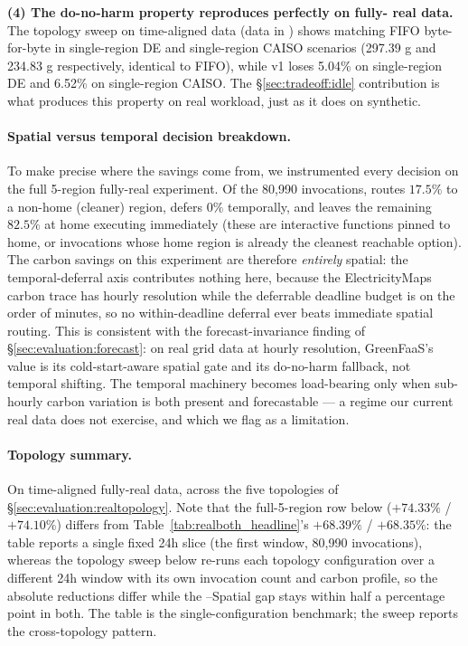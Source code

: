 \textbf{(4) The do-no-harm property reproduces perfectly on fully-
real data.} The topology sweep on time-aligned data (data in
) shows
\GreenFaaS{} matching FIFO byte-for-byte in single-region DE and
single-region CAISO scenarios (297.39 g and 234.83 g respectively,
identical to FIFO), while v1 loses 5.04\% on single-region DE and
6.52\% on single-region CAISO. The
\S\ref{sec:tradeoff:idle} contribution is what produces this
property on real workload, just as it does on synthetic.

\paragraph{Spatial versus temporal decision breakdown.}
To make precise where the savings come from, we instrumented every
\GreenFaaS{} decision on the full 5-region fully-real experiment. Of
the 80{,}990 invocations, \GreenFaaS{} routes $17.5\%$ to a non-home
(cleaner) region, defers $0\%$ temporally, and leaves the
remaining $82.5\%$ at home executing immediately (these are
interactive functions pinned to home, or invocations whose home
region is already the cleanest reachable option). The carbon savings
on this experiment are therefore \emph{entirely} spatial: the
temporal-deferral axis contributes nothing here, because the
ElectricityMaps carbon trace has hourly resolution while the
deferrable deadline budget is on the order of minutes, so no
within-deadline deferral ever beats immediate spatial routing. This
is consistent with the forecast-invariance finding of
\S\ref{sec:evaluation:forecast}: on real grid data at hourly
resolution, GreenFaaS's value is its cold-start-aware spatial gate
and its do-no-harm fallback, not temporal shifting. The temporal
machinery becomes load-bearing only when sub-hourly carbon variation
is both present and forecastable --- a regime our current real data
does not exercise, and which we flag as a limitation.

\paragraph{Topology summary.} On time-aligned fully-real data,
across the five topologies of
\S\ref{sec:evaluation:realtopology}. Note that the full-5-region row
below ($+74.33\%$ / $+74.10\%$) differs from
Table~\ref{tab:realboth_headline}'s $+68.39\%$ / $+68.35\%$: the
table reports a single fixed 24h slice (the first window, 80{,}990
invocations), whereas the topology sweep below re-runs each topology
configuration over a different 24h window with its own invocation
count and carbon profile, so the absolute reductions differ while the
\GreenFaaS{}--Spatial gap stays within half a percentage point in
both. The table is the single-configuration benchmark; the sweep
reports the cross-topology pattern.

